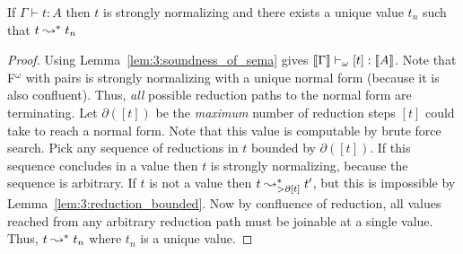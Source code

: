 \begin{theorem}
    \label{lem:3:proof_normalization}
    If $\Gamma \vdash t : A$ then $t$ is strongly normalizing and there exists a unique value $t_n$ such that $t \leadsto^* t_n$
\end{theorem}
\begin{proof}
    Using Lemma~\ref{lem:3:soundness_of_sema} gives $\llbracket \Gamma \rrbracket \vdash_\omega [t] : \llbracket A \rrbracket$.
    Note that F$^\omega$ with pairs is strongly normalizing with a unique normal form (because it is also confluent).
    Thus, \textit{all} possible reduction paths to the normal form are terminating.
    Let $\partial([t])$ be the \textit{maximum} number of reduction steps $[t]$ could take to reach a normal form.
    Note that this value is computable by brute force search.
    Pick any sequence of reductions in $t$ bounded by $\partial([t])$.
    If this sequence concludes in a value then $t$ is strongly normalizing, because the sequence is arbitrary.
    If $t$ is not a value then $t \leadsto^*_{>\partial[t]} t^\prime$, but this is impossible by Lemma~\ref{lem:3:reduction_bounded}.
    Now by confluence of reduction, all values reached from any arbitrary reduction path must be joinable at a single value.
    Thus, $t \leadsto^* t_n$ where $t_n$ is a unique value.
\end{proof}
